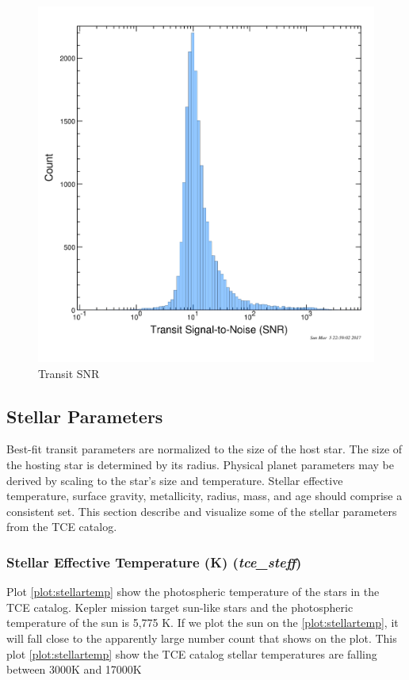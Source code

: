 \begin{figure}[!h]
\begin{center}
        \includegraphics[width=0.5\textheight]{img/transitsnr.png}
        \caption{Transit SNR}  \label{plot:transitsnr}
\end{center}
\end{figure}

\subsection{Stellar Parameters}
Best-fit transit parameters are normalized to the size of the host star. The size of the hosting star is determined by its radius. Physical planet parameters may be derived by scaling to the star's size and temperature. Stellar effective temperature, surface gravity, metallicity, radius, mass, and age should comprise a consistent set. This section describe and visualize some of the stellar parameters from the TCE catalog.

\subsubsection{Stellar Effective Temperature (K) (\emph{tce\_steff})}
Plot \ref{plot:stellartemp} show the photospheric temperature of the stars in the TCE catalog. Kepler mission target sun-like stars and the photospheric temperature of the sun is 5,775 K. If we plot the sun on the \ref{plot:stellartemp}, it will fall close to the apparently large number count that shows on the plot. This plot \ref{plot:stellartemp} show the TCE catalog stellar temperatures are falling between 3000K and 17000K 


